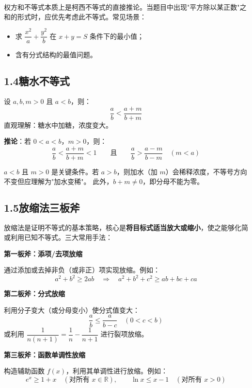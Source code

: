 \documentclass[12pt, a4paper]{ctexart}
\begin{document}
\begin{tipbox}[使用要点]
权方和不等式本质上是柯西不等式的直接推论。当题目中出现"平方除以某正数"之和的形式时，应优先考虑此不等式。常见场景：
\begin{itemize}
  \item 求 $\dfrac{x^2}{a}+\dfrac{y^2}{b}$ 在 $x+y=S$ 条件下的最小值；
  \item 含有分式结构的最值问题。
\end{itemize}
\end{tipbox}

\subsection*{1.4\quad 糖水不等式}

\begin{knowledgebox}[糖水不等式]
设 $a,b,m>0$ 且 $a<b$，则：
\[
\frac{a}{b} < \frac{a+m}{b+m}
\]
直观理解：糖水中加糖，浓度变大。

\medskip
\textbf{推论}：若 $0<a<b$，$m>0$，则：
\[
\frac{a}{b} < \frac{a+m}{b+m} < 1
\qquad\text{且}\qquad
\frac{a}{b} > \frac{a-m}{b-m}\quad (m<a)
\]
\end{knowledgebox}

\begin{warnbox}[糖水不等式的条件]
$a<b$ 且 $m>0$ 是关键条件。若 $a>b$，则加水（加 $m$）会稀释浓度，不等号方向不变但应理解为"加水变稀"。
此外，$b+m \neq 0$，即分母不能为零。
\end{warnbox}

\subsection*{1.5\quad 放缩法三板斧}

\begin{knowledgebox}[放缩法核心思想]
放缩法是证明不等式的基本策略，核心是\textbf{将目标式适当放大或缩小}，使之能够化简或利用已知不等式。三大常用手法：

\medskip
\textbf{第一板斧：添项/去项放缩}

通过添加或去掉非负（或非正）项实现放缩。例如：
\[
a^2+b^2 \geqslant 2ab \quad\Longrightarrow\quad a^2+b^2+c^2 \geqslant ab+bc+ca
\]

\textbf{第二板斧：分式放缩}

利用分子变大（或分母变小）使分式值变大：
\[
\frac{a}{b} \leqslant \frac{a}{b-c} \quad (0<c<b)
\]
或利用 $\dfrac{1}{n(n+1)}=\dfrac{1}{n}-\dfrac{1}{n+1}$ 进行裂项放缩。

\textbf{第三板斧：函数单调性放缩}

构造辅助函数 $f(x)$，利用其单调性进行放缩。例如：
\[
e^x \geqslant 1+x \quad (\text{对所有 } x\in\mathbb{R}),\qquad
\ln x \leqslant x-1 \quad (\text{对所有 } x>0)
\]
\end{knowledgebox}
\end{document}
